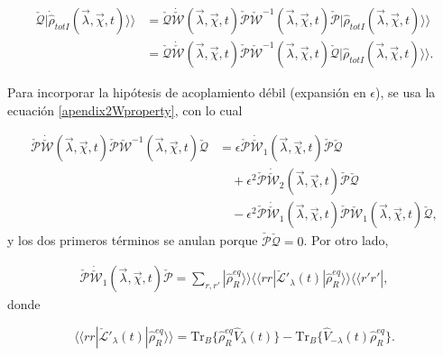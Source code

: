 \begin{appendixs}
\begin{align*}
\check{\mathcal{Q}}|\dot{\hat{\rho}}_{totI}(\vec{\lambda},\vec{\chi},t) \rangle \rangle &= \check{\mathcal{Q}}\dot{\check{\mathcal{W}}}(\vec{\lambda},\vec{\chi},t)\check{\mathcal{P}}\check{\mathcal{W}}^{-1}(\vec{\lambda},\vec{\chi},t)\check{\mathcal{P}}|\hat{\rho}_{totI}(\vec{\lambda},\vec{\chi},t)\rangle \rangle \\
&= \check{\mathcal{Q}}\dot{\check{\mathcal{W}}}(\vec{\lambda},\vec{\chi},t)\check{\mathcal{P}}\check{\mathcal{W}}^{-1}(\vec{\lambda},\vec{\chi},t)\check{\mathcal{Q}}|\hat{\rho}_{totI}(\vec{\lambda},\vec{\chi},t)\rangle \rangle .
\end{align*}

Para incorporar la hipótesis de acoplamiento débil (expansión en \(\epsilon\)), se usa la ecuación \eqref{apendix2Wproperty}, con lo cual

\begin{align*}
\check{\mathcal{P}}\dot{\check{\mathcal{W}}}(\vec{\lambda},\vec{\chi},t)\check{\mathcal{P}}\check{\mathcal{W}}^{-1}(\vec{\lambda},\vec{\chi},t)\check{\mathcal{Q}} &= \epsilon \check{\mathcal{P}}\dot{\check{\mathcal{W}}}_{1}(\vec{\lambda},\vec{\chi},t) \check{\mathcal{P}}\check{\mathcal{Q}} \\
&\quad + \epsilon^{2} \check{\mathcal{P}}\dot{\check{\mathcal{W}}}_{2}(\vec{\lambda},\vec{\chi},t) \check{\mathcal{P}}\check{\mathcal{Q}} \\
&\quad - \epsilon^{2}\check{\mathcal{P}}\dot{\check{\mathcal{W}}}_{1}(\vec{\lambda},\vec{\chi},t)\check{\mathcal{P}} \check{\mathcal{W}}_{1}(\vec{\lambda},\vec{\chi},t)\check{\mathcal{Q}},
\end{align*}
y los dos primeros términos se anulan porque \(\check{\mathcal{P}}\check{\mathcal{Q}}=0\). Por otro lado,

\begin{align*}
\check{\mathcal{P}}\dot{\check{\mathcal{W}}}_{1}(\vec{\lambda},\vec{\chi},t)\check{\mathcal{P}} = \sum_{r,r'}|\hat{\rho}^{eq}_{R} \rangle \rangle \langle \langle rr| \check{\mathcal{L}}'_{\lambda}(t)|\hat{\rho}_{R}^{eq}\rangle \rangle \langle \langle r'r'|,
\end{align*}
donde

\begin{equation}
\langle \langle rr|\check{\mathcal{L}}'_{\lambda}(t)|\hat{\rho}_{R}^{eq}\rangle \rangle  = \text{Tr}_{B}\{\hat{\rho}^{eq}_{R}\hat{V}_{\lambda}(t)\} - \text{Tr}_{B}\{\hat{V}_{-\lambda}(t)\hat{\rho}^{eq}_{R}\}.
\label{sec3:ecrandom}
\end{equation}


\end{appendixs}
